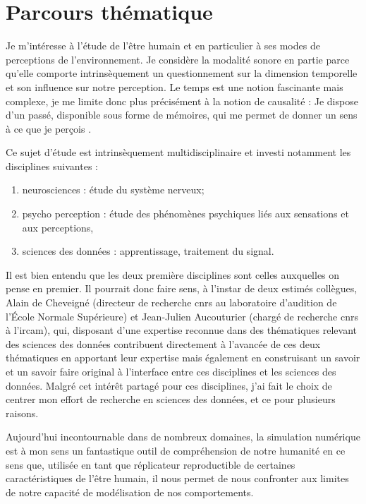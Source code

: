 \chapter{\nmu Parcours  thématique} \label{chap:themes}

Je m'intéresse à l'étude de l'être humain et en particulier à ses modes de perceptions de l'environnement. Je considère la modalité sonore en partie parce qu'elle comporte intrinsèquement un questionnement sur la dimension temporelle et son influence sur notre perception. Le temps est une notion fascinante mais complexe, je me limite donc plus précisément à la notion de causalité : \og Je dispose d'un passé, disponible sous forme de mémoires, qui me permet de donner un sens à ce que je perçois \fg.


Ce sujet d'étude est intrinsèquement multidisciplinaire et investi notamment les disciplines suivantes :
\begin{enumerate}
  \item neurosciences : étude du système nerveux;
  \item psycho perception : étude des phénomènes psychiques liés aux sensations et aux perceptions,
  \item sciences des données : apprentissage, traitement du signal.
\end{enumerate}

Il est bien entendu que les deux première disciplines sont  celles auxquelles on pense en premier. Il pourrait donc faire sens, à l'instar de deux estimés collègues, Alain de Cheveigné (directeur de recherche cnrs au laboratoire d'audition de l'\'Ecole Normale Supérieure) et Jean-Julien Aucouturier (chargé de recherche cnrs à l'ircam), qui, disposant d'une expertise reconnue dans des thématiques relevant des sciences des données contribuent directement à l'avancée de ces deux thématiques en apportant leur expertise mais également en construisant un savoir et un savoir faire original à l'interface entre ces disciplines et les sciences des données. Malgré cet intérêt partagé pour ces disciplines, j'ai fait le choix de centrer mon effort de recherche en sciences des données, et ce pour plusieurs raisons.

Aujourd'hui incontournable dans de nombreux domaines, la simulation numérique est à mon sens un fantastique outil de compréhension de notre humanité en ce sens que, utilisée en tant que \og réplicateur reproductible \fg de certaines caractéristiques de l'être humain, il nous permet de nous confronter aux limites de notre capacité de modélisation de nos comportements.

